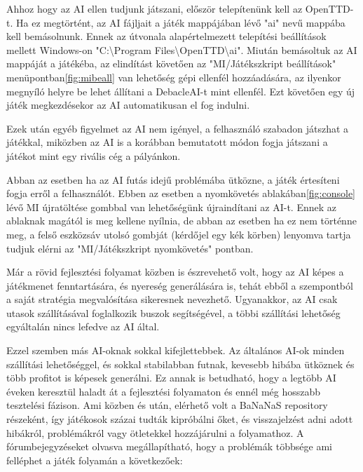 

Ahhoz hogy az AI ellen tudjunk játszani, először telepítenünk kell az OpenTTD-t. Ha ez megtörtént, az AI fájljait a játék mappájában lévő "ai" nevű mappába kell bemásolnunk. Ennek az útvonala alapértelmezett telepítési beállítások mellett Windows-on "C:\textbackslash Program Files\textbackslash OpenTTD\textbackslash ai". Miután bemásoltuk az AI mappáját a játékéba, az elindítást követően az "MI/Játékszkript beállítások" menüpontban\ref{fig:mibeall} van lehetőség gépi ellenfél hozzáadására, az ilyenkor megnyíló helyre be lehet állítani a DebacleAI-t mint ellenfél. Ezt követően egy új játék megkezdésekor az AI automatikusan el fog indulni.

Ezek után egyéb figyelmet az AI nem igényel, a felhasználó szabadon játszhat a játékkal, miközben az AI is a korábban bemutatott módon fogja játszani a játékot mint egy rivális cég a pályánkon.

Abban az esetben ha az AI futás idejű problémába ütközne, a játék értesíteni fogja erről a felhasználót. Ebben az esetben a nyomkövetés ablakában\ref{fig:console} lévő MI újratöltése gombbal van lehetőségünk újraindítani az AI-t. Ennek az ablaknak magától is meg kellene nyílnia, de abban az esetben ha ez nem történne meg, a felső eszközsáv utolsó gombját (kérdőjel egy kék körben) lenyomva tartja tudjuk elérni az "MI/Játékszkript nyomkövetés" pontban.


Már a rövid fejlesztési folyamat közben is észrevehető volt, hogy az AI képes a játékmenet fenntartására, és nyereség generálására is, tehát ebből a szempontból a saját stratégia megvalósítása sikeresnek nevezhető. Ugyanakkor, az AI csak utasok szállításával foglalkozik buszok segítségével, a többi szállítási lehetőség egyáltalán nincs lefedve az AI által.

Ezzel szemben más AI-oknak sokkal kifejlettebbek. Az általános AI-ok minden szállítási lehetőséggel, és sokkal stabilabban futnak, kevesebb hibába ütköznek és több profitot is képesek generálni. Ez annak is betudható, hogy a legtöbb AI éveken keresztül haladt át a fejlesztési folyamaton és ennél még hosszabb tesztelési fázison. Ami közben és után, elérhető volt a BaNaNaS repository részeként, így játékosok százai tudták kipróbálni őket, és visszajelzést adni adott hibákról, problémákról vagy ötletekkel hozzájárulni a folyamathoz. A fórumbejegyzéseket olvasva megállapítható, hogy a problémák többsége ami felléphet a játék folyamán a következőek: 


